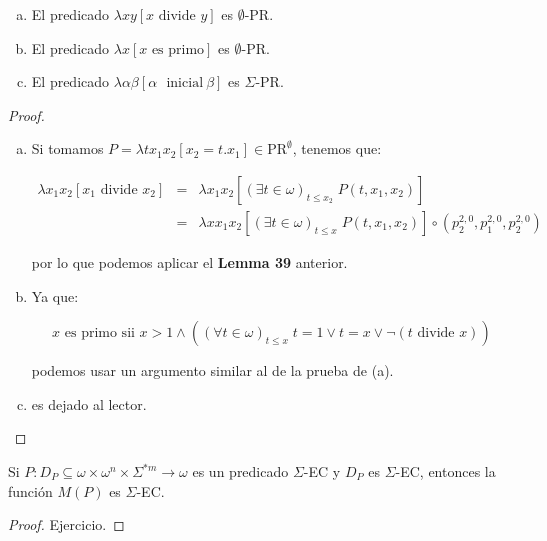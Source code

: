   \begin{lemma}
    \begin{enumerate}[a)]
      \item El predicado $\lambda xy\left[x \text{ divide } y\right]$ es $\emptyset$-PR.
      \item El predicado $\lambda x\left[x \text{ es primo}\right]$ es $\emptyset$-PR.
      \item El predicado $\lambda \alpha\beta \left[\alpha \text{\ }\mathrm{ inicial}\ \beta \right]$ es $\Sigma$-PR.
    \end{enumerate}
  \end{lemma}
  \begin{proof}
    \begin{enumerate}[a)]
      \item Si tomamos $P = \lambda tx_{1}x_{2}\left[x_{2}=t.x_{1}\right] \in \mathrm{PR}^{\emptyset}$, tenemos que:

        \begin{eqnarray}
          \nonumber \lambda x_{1}x_{2} \left[x_{1}\text{ divide } x_{2}\right] &=& \lambda x_{1}x_{2}\left[(\exists t
            \in \omega)_{t\leq x_{2}} \; P(t,x_{1},x_{2}) \right] \\
          \nonumber &=& \lambda xx_{1}x_{2}\left[(\exists t \in \omega)_{t\leq x} \; P(t,x_{1},x_{2})\right] \circ
            \left(p_{2}^{2,0}, p_{1}^{2,0}, p_{2}^{2,0}\right)
        \end{eqnarray}

        \par por lo que podemos aplicar el \textbf{Lemma 39} anterior.

      \item Ya que:

        \[
          x \text{ es primo sii } x > 1 \wedge \left((\forall t \in \omega)_{t\leq x} \; t=1 \vee t=x \vee \lnot
          (t\text{ divide } x)\right)
        \]

        \par podemos usar un argumento similar al de la prueba de (a).
      \item es dejado al lector.
    \end{enumerate}
  \end{proof}

  \begin{lemma}
    \par Si $P: D_{P} \subseteq \omega \times \omega^{n} \times \Sigma^{\ast m} \rightarrow \omega$ es un predicado
    $\Sigma$-EC y $ D_{P}$ es $\Sigma$-EC, entonces la función $M(P)$ es $\Sigma$-EC.
  \end{lemma}
  \begin{proof}
    \par Ejercicio.
  \end{proof}

